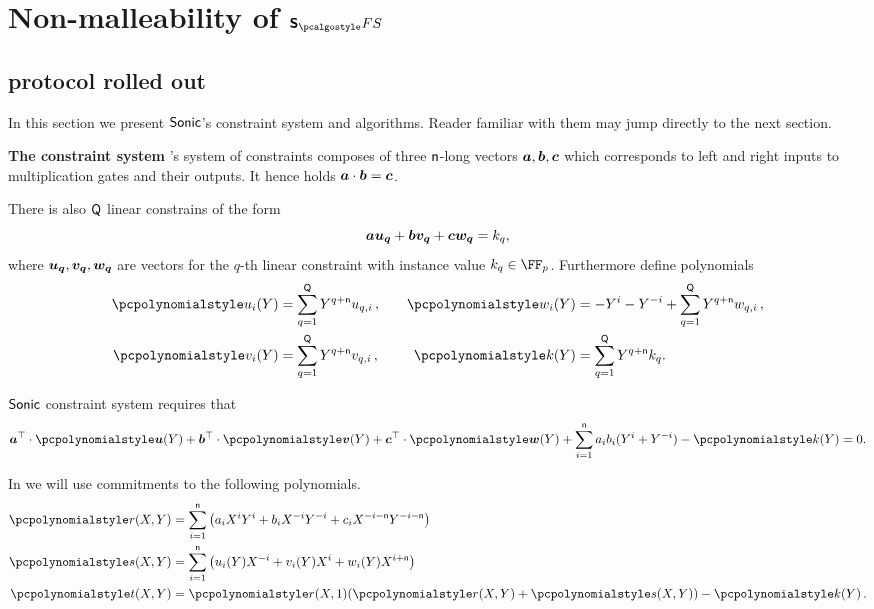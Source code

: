 \documentclass[runningheads,11pt]{llncs}
\let\spvec\vec
\let\vec\accentvec
\let\spvec\vec
\let\vec\spvec
\def\vec#1{\mathchoice{\mbox{\boldmath$\displaystyle#1$}}
  {\mbox{\boldmath$\textstyle#1$}} {\mbox{\boldmath$\scriptstyle#1$}}
  {\mbox{\boldmath$\scriptscriptstyle#1$}}}
\newcommand{\oursubsub}[1] {\smallskip\noindent\textbf{#1}}
\begin{document}
\section{Non-malleability of $\sonicprotfs$}
\label{sec:sonic}
\subsection{\sonic{} protocol rolled out}
In this section we present ${\textnormal{\textsf{Sonic}}}$'s constraint system and algorithms. Reader
familiar with them may jump directly to the next section.

\oursubsub{The constraint system}
\label{sec:sonic_constraint_system}
\sonic's system of constraints composes of three $\mathsf{n}$-long vectors
$\va, \vb, \vc$ which corresponds to left and right inputs to multiplication
gates and their outputs. It hence holds $\va \cdot \vb = \vc$.

There is also $\mathsf{Q}$ linear constrains of the form
\[
  \va \vec{u_q} + \vb \vec{v_q} + \vc \vec{w_q} = k_q,
\]
where $\vec{u_q}, \vec{v_q}, \vec{w_q}$ are vectors for the $q$-th linear
constraint with instance value $k_q \in \FF_p$. Furthermore define polynomials
\begin{equation}
  \begin{split}
    \p{u_i}(Y) & = \sum_{q = 1}^\linconstr Y^{q + \multconstr} u_{q, i}\,,\\
    \p{v_i}(Y) & = \sum_{q = 1}^\linconstr Y^{q + \multconstr} v_{q, i}\,,\\
  \end{split}
  \qquad
  \begin{split}
    \p{w_i}(Y) & = -Y^i - Y^{-i} + \sum_{q = 1}^\linconstr Y^{q +
      \multconstr} w_{q, i}\,,\\
    \p{k}(Y) & = \sum_{q = 1}^\linconstr Y^{q + \multconstr} k_{q}.
  \end{split}
\end{equation}

${\textnormal{\textsf{Sonic}}}$ constraint system requires that
\begin{align}
  \label{eq:sonic_constraint}
  \vec{a}^\top \cdot \vec{\p{u}} (Y) + \vec{b}^\top \cdot \vec{\p{v}} (Y) +
  \vec{c}^\top \cdot \vec{\p{w}} (Y) + \sum_{i = 1}^{\multconstr} a_i b_i (Y^i +
  Y^{-i}) - \p{k} (Y) = 0.
\end{align}

In \sonic{} we will use commitments to the following polynomials.
\begin{align*}
  \pr(X, Y) & = \sum_{i = 1}^{\multconstr} \left(a_i X^i Y^i + b_i X^{-i} Y^{-i}
              + c_i X^{-i - \multconstr} Y^{-i - \multconstr}\right) \\
  \p{s}(X, Y) & = \sum_{i = 1}^{\multconstr} \left( u_i (Y) X^{-i} +
                v_i(Y) X^i + w_i(Y) X^{i + \multconstr}\right)\\
  \pt(X, Y) & = \pr(X, 1) (\pr(X, Y) + \p{s}(X, Y)) - \p{k}(Y)\,.
\end{align*}
\end{document}

